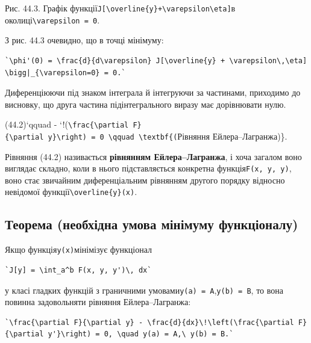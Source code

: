 \documentclass[
  ukrainian,
]{article}
\begin{document}
Рис. 44.3. Графік
функції\texttt{J{[}\textbackslash{}overline\{y\}+\textbackslash{}varepsilon\textbackslash{}eta{]}}в
околиці\texttt{\textbackslash{}varepsilon\ =\ 0}.

З рис. 44.3 очевидно, що в точці мінімуму:

\begin{verbatim}
`\phi'(0) = \frac{d}{d\varepsilon} J[\overline{y} + \varepsilon\,\eta] \bigg|_{\varepsilon=0} = 0.`
\end{verbatim}

Диференціюючи під знаком інтеграла й інтегруючи за частинами, приходимо
до висновку, що друга частина підінтегрального виразу має дорівнювати
нулю.

(44.2)`qquad -
`!\left(\texttt{\textbackslash{}frac\{\textbackslash{}partial\ F\}\{\textbackslash{}partial\ y\textquotesingle{}\}\textbackslash{}right)\ =\ 0\ \textbackslash{}qquad\ \textbackslash{}textbf\{(}Рівняння
Ейлера--Лагранжа)\}.

Рівняння (44.2) називається \textbf{рівнянням Ейлера--Лагранжа}, і хоча
загалом воно виглядає складно, коли в нього підставляється конкретна
функція\texttt{F(x,\ y,\ y\textquotesingle{})}, воно стає звичайним
диференціальним рівнянням другого порядку відносно невідомої
функції\texttt{\textbackslash{}overline\{y\}(x)}.

\subsection{Теорема (необхідна умова мінімуму
функціоналу)}\label{ux442ux435ux43eux440ux435ux43cux430-ux43dux435ux43eux431ux445ux456ux434ux43dux430-ux443ux43cux43eux432ux430-ux43cux456ux43dux456ux43cux443ux43cux443-ux444ux443ux43dux43aux446ux456ux43eux43dux430ux43bux443}

Якщо функція\texttt{y(x)}мінімізує функціонал

\begin{verbatim}
`J[y] = \int_a^b F(x, y, y')\, dx`
\end{verbatim}

у класі гладких функцій з граничними
умовами\texttt{y(a)\ =\ A},\texttt{y(b)\ =\ B}, то вона повинна
задовольняти рівняння Ейлера--Лагранжа:

\begin{verbatim}
`\frac{\partial F}{\partial y} - \frac{d}{dx}\!\left(\frac{\partial F}{\partial y'}\right) = 0, \quad y(a) = A,\ y(b) = B.`
\end{verbatim}
\end{document}
